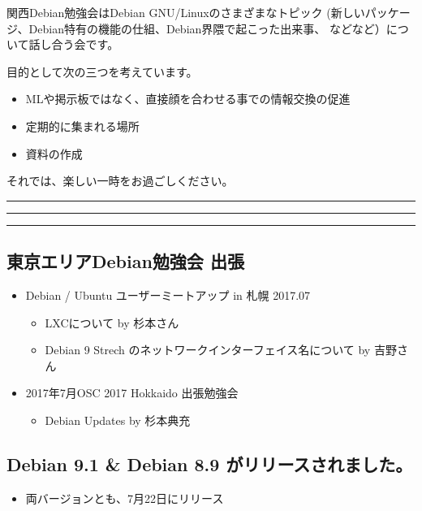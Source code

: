 \documentclass[mingoth,a4paper]{jsarticle}
\begin{document}
\vspace{1em}

関西Debian勉強会はDebian GNU/Linuxのさまざまなトピック
(新しいパッケージ、Debian特有の機能の仕組、Debian界隈で起こった出来事、
などなど）について話し合う会です。

目的として次の三つを考えています。
\begin{itemize}
\item MLや掲示板ではなく、直接顔を合わせる事での情報交換の促進
\item 定期的に集まれる場所
\item 資料の作成
\end{itemize}

それでは、楽しい一時をお過ごしください。

\newpage

\begin{minipage}[b]{0.2\hsize}
  {}
\end{minipage}
\begin{minipage}[b]{0.8\hsize}
\hrule
\vspace{2mm}
\hrule
\setcounter{tocdepth}{1}
\tableofcontents
\vspace{2mm}
\hrule
\end{minipage}


\subsection{東京エリアDebian勉強会 出張}
\begin{itemize}
  \item Debian / Ubuntu ユーザーミートアップ in 札幌 2017.07
    \begin{itemize}
        \item{LXCについて by 杉本さん}
        \item{Debian 9 Strech のネットワークインターフェイス名について by 吉野さん}
    \end{itemize}
  \item 2017年7月OSC 2017 Hokkaido 出張勉強会
    \begin{itemize}
        \item{Debian Updates by 杉本典充}
    \end{itemize}
\end{itemize}

\subsection{Debian 9.1 \& Debian 8.9  がリリースされました。}
\begin{itemize}
  \item 両バージョンとも、7月22日にリリース
\end{itemize}
\end{document}
